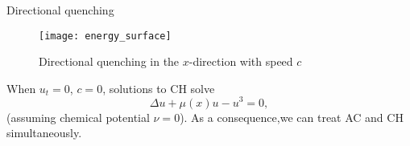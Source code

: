 \documentclass[final]{beamer}
\newlength{\onecolwid}
\begin{document}
\begin{frame}[t]
\begin{columns}[t]
\begin{column}{\onecolwid}
\begin{block}{Directional quenching}
\begin{figure}
\vspace{-2cm}
\centering
\texttt{[image: energy\_surface]}
\caption{Directional quenching in the $x$-direction with speed $c$}
\end{figure}
%
%

 When $u_t=0$,  $c=0$, solutions to CH solve 
\begin{equation*}%
  \Delta u + \mu(x) u  - u^3 = 0,
\end{equation*}
(assuming chemical potential $\nu =0$).  As a consequence,we can treat AC and CH simultaneously. 
 
 
\end{block}


\end{column}
\end{columns}
\end{frame}
\end{document}
